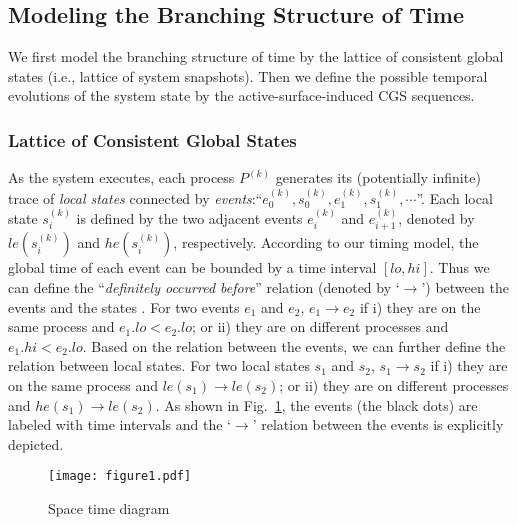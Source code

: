 \documentclass[10pt,conference,compsocconf,letterpaper]{IEEEtran}
\begin{document}
\subsection{Modeling the Branching Structure of Time}

We first model the branching structure of time by the lattice of consistent global states (i.e., lattice of system snapshots). Then we define the possible temporal evolutions of the system state by the active-surface-induced CGS sequences.

\subsubsection{Lattice of Consistent Global States}

As the system executes, each process $P^{(k)}$ generates its (potentially infinite) trace of \textit{local states} connected by \textit{events}:``$e^{(k)}_0, s^{(k)}_0, e^{(k)}_1, s^{(k)}_1, \cdots$''. Each local state $s^{(k)}_i$ is defined by the two adjacent events $e^{(k)}_i$ and $e^{(k)}_{i+1}$, denoted by $le(s^{(k)}_i)$ and $he(s^{(k)}_i)$, respectively. According to our timing model, the global time of each event can be bounded by a time interval $[lo,hi]$. Thus we can define the ``\textit{definitely occurred before}'' relation (denoted by `$\rightarrow$') between the events and the states \cite{Stoller00}. For two events $e_1$ and $e_2$, $e_1 \rightarrow e_2$ if i) they are on the same process and $e_1.lo < e_2.lo$; or ii) they are on different processes and $e_1.hi < e_2.lo$. Based on the relation between the events, we can further define the relation between local states. For two local states $s_1$ and $s_2$, $s_1 \rightarrow s_2$ if i) they are on the same process and $le(s_1) \rightarrow le(s_2)$; or ii) they are on different processes and $he(s_1) \rightarrow le(s_2)$. As shown in Fig.~\ref{F:space-time diagram}, the events (the black dots) are labeled with time intervals and the `$\rightarrow$' relation between the events is explicitly depicted.

\begin{figure}[tbp]
\begin{center}
  \texttt{[image: figure1.pdf]}
  \caption{Space time diagram}
  \label{F:space-time diagram}
\end{center}
\end{figure}
\end{document}
